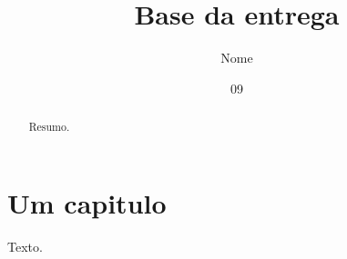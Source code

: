 \documentclass[dsc]{ufrj}
\title{Base da entrega}
\author{Nome}{Sobrenome}
\date{09}{2026}
\begin{document}
  \maketitle
  \frontmatter
  \begin{abstract}Resumo.\end{abstract}
  \tableofcontents
  \mainmatter
  \chapter{Um capitulo}
  Texto.\nocite{m-diss}
  \printbibliography
\end{document}
